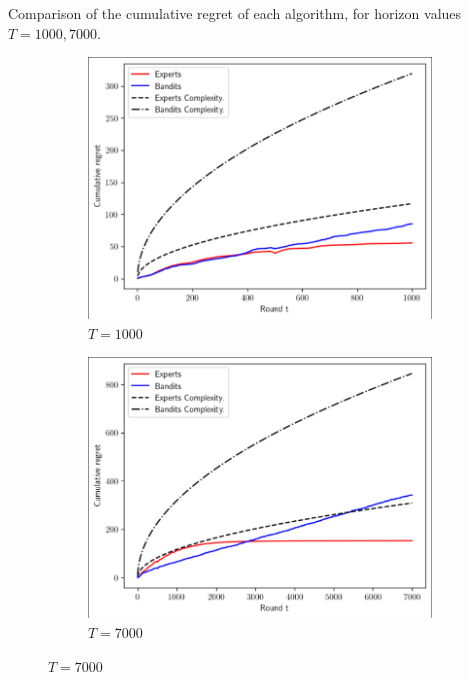\documentclass[12pt]{article}
\begin{document}
\begin{enumerate}
		
		Comparison of the cumulative regret of each algorithm, for horizon values $T=1000,7000$.
		\begin{figure}[h!]
			\centering
			\begin{subfigure}[b]{0.45\textwidth}
				\centering
				\includegraphics[width=\textwidth]{fig1.png}
				\caption{$T=1000$}
			\end{subfigure}
			\hfill
			\begin{subfigure}[b]{0.45\textwidth}
				\centering
				\includegraphics[width=\textwidth]{fig2.png}
				\caption{$T=7000$}
			\end{subfigure}		
		\end{figure}
	

\end{enumerate}
\end{document}
